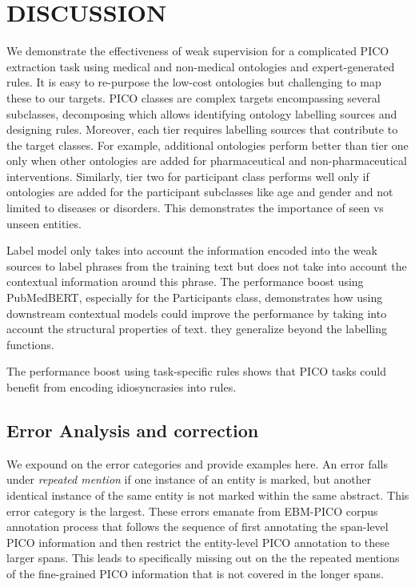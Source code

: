 \documentclass[10.7pt,]{article}
\begin{document}
%
%
%
\section{DISCUSSION}\label{discussion}
%
We demonstrate the effectiveness of weak supervision for a complicated PICO extraction task using medical and non-medical ontologies and expert-generated rules.
It is easy to re-purpose the low-cost ontologies but challenging to map these to our targets.
PICO classes are complex targets encompassing several subclasses, decomposing which allows identifying ontology labelling sources and designing rules. 
Moreover, each tier requires labelling sources that contribute to the target classes.
For example, additional ontologies perform better than tier one only when other ontologies are added for pharmaceutical and non-pharmaceutical interventions.
Similarly, tier two for participant class performs well only if ontologies are added for the participant subclasses like age and gender and not limited to diseases or disorders.
This demonstrates the importance of seen vs unseen entities. 

Label model only takes into account the information encoded into the weak sources to label phrases from the training text but does not take into account the contextual information around this phrase.
The performance boost using PubMedBERT, especially for the Participants class, demonstrates how using downstream contextual models could improve the performance by taking into account the structural properties of text.
they generalize beyond the labelling functions.

The performance boost using task-specific rules shows that PICO tasks could benefit from encoding idiosyncrasies into rules.

%
%
%
\subsection{Error Analysis and correction}\label{err_ana}
%
We expound on the error categories and provide examples here.
An error falls under \textit{repeated mention} if one instance of an entity is marked, but another identical instance of the same entity is not marked within the same abstract. 
This error category is the largest.
These errors emanate from EBM-PICO corpus annotation process that follows the sequence of first annotating the span-level PICO information and then restrict the entity-level PICO annotation to these larger spans.
This leads to specifically missing out on the the repeated mentions of the fine-grained PICO information that is not covered in the longer spans.
\end{document}
